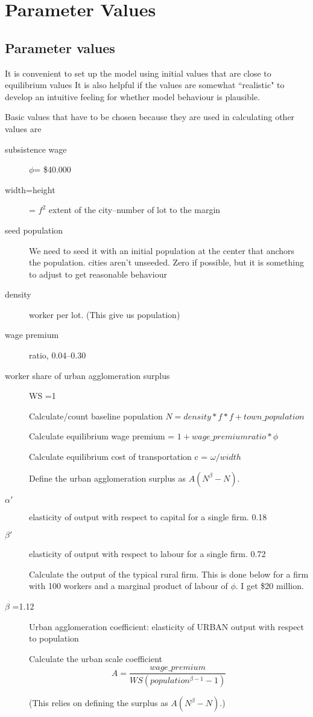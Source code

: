 \chapter[Parameters]{Parameter Values} \label{appendix-paremeters}


\section{Parameter values}
It is convenient to set up the model using initial values that are close to equilibrium values It is also helpful if the values are somewhat ``realistic" to develop an intuitive feeling for whether model behaviour is plausible. 

Basic values that have to be chosen because they are used in calculating other values are
\begin{description}
\item  [subsistence wage] $\phi$=  \$40.000 %
\item  [width=height] = $f^2$ extent of the city--number of lot to the margin 
\item [seed population] We need to seed it with an initial population at the center that anchors the population. cities aren't unseeded.  Zero if possible, but it is something to adjust to get reasonable behaviour
\item  [density ] worker per lot. (This give us population)
\item  [wage premium] ratio, 0.04--0.30 
\item [worker share of urban agglomeration surplus] 
WS =1 

Calculate/count baseline population 
$N=density * f * f  + town\_population$

Calculate  equilibrium wage premium = $1+wage\_premium ratio * \phi$

Calculate equilibrium cost of transportation c = $\omega/width$

Define the urban agglomeration surplus as $A(N^\beta-N)$.
 
\item  [$\alpha'$ ]  elasticity of output with respect to capital for a single firm. 0.18
\item  [$\beta'$ ]  elasticity of output with respect to labour for a single firm.  0.72

Calculate the output of the typical rural firm. This is done below for a firm with 100 workers and a marginal product of labour of $\phi$. I get \$20 million.

\item  [$\beta$ =1.12] Urban agglomeration coefficient: elasticity of URBAN output with respect to population 

Calculate the urban scale coefficient 
\[A = \frac{wage\_premium}{WS(population^{\beta-1}-1)}\]

(This relies on defining the surplus as $A(N^\beta-N)$.)

\end{description}


